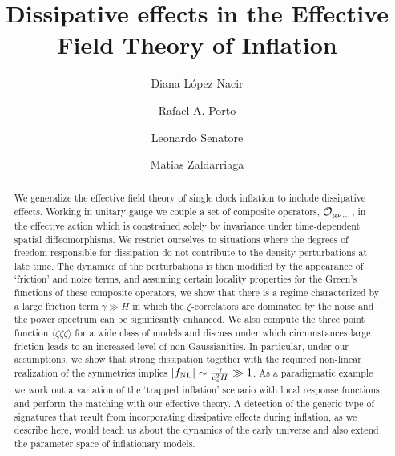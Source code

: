 \documentclass[11pt,amsmath,floats,floatfix,nofootinbib,secnumarabic, superscriptaddress, tightenlines]{revtex4}
\newcommand{\calo}{{\cal O}}
\begin{document}
\title{Dissipative effects in the Effective Field Theory of Inflation}

\begin{abstract}
We generalize the effective field theory of single clock inflation to include dissipative effects. Working in unitary gauge we couple a set of composite operators, $\calo_{\mu\nu\ldots}$, in the effective action which is constrained solely by invariance under time-dependent spatial diffeomorphisms. We restrict ourselves to situations where the degrees of freedom responsible for dissipation do not contribute to the density perturbations at late time. The dynamics of the perturbations is then modified by the appearance of `friction' and noise terms, and assuming certain locality properties for the Green's functions of these composite operators, we show that there is a regime characterized by a large friction term $\gamma \gg H$ in which the $\zeta$-correlators are dominated by the noise and the power spectrum can be significantly enhanced. We also compute the three point function $\langle \zeta\zeta\zeta\rangle$ for a wide class of models and discuss under which circumstances large friction leads to an increased level of non-Gaussianities. In particular, under our assumptions, we show that strong dissipation together with the required non-linear realization of the symmetries implies $|f_{\rm NL}| \sim \frac{\gamma}{c_s^2H} \gg 1$. As a paradigmatic example we work out a variation of the `trapped inflation' scenario with local response functions and perform the matching with our effective theory.  A detection of the generic type of signatures that result from incorporating dissipative effects during inflation, as we describe here, would teach us about the dynamics of the early universe and also extend the parameter space of inflationary models.
\end{abstract}

\author{Diana L\'opez Nacir}
\author{Rafael A. Porto}
\author{Leonardo Senatore} 
\author{Matias Zaldarriaga}
\end{document}
